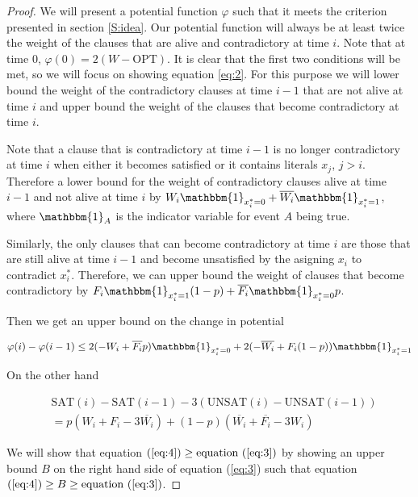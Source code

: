 \documentclass[11pt,letter]{article}
\numberwithin{theorem}{section}
\renewcommand{\phi}{\varphi}
\begin{document}
\begin{proof}
We will present a potential function $\phi$ such that it meets the criterion presented in section \ref{S:idea}. Our potential function will always
 be at least twice the weight of the clauses that are alive and contradictory at time $i$. Note that at time $0$,
 $\phi(0) = 2(W-\textrm{OPT})$. It is clear that the first two conditions will be met, so we will focus on showing equation \ref{eq:2}.
 For this purpose we will lower bound the weight of the contradictory clauses at time $i-1$ that are not alive at time $i$
 and upper bound the weight of the clauses that become contradictory at time $i$.

Note that a clause that is contradictory at time $i-1$ is no longer contradictory at time $i$ when either it becomes satisfied
or it contains literals $x_j$, $j > i$. Therefore a lower bound for the weight of contradictory clauses alive at time $i-1$ and
 not alive at time $i$ by $W_i \mathbbm{1}_{x_i^* = 0} + \overline{W_i} \mathbbm{1}_{x_i^* = 1}$, where $\mathbbm{1}_A$ is the indicator variable for event $A$ being true.

Similarly, the only clauses that can become contradictory at time $i$ are those that are still alive at time $i-1$ and become unsatisfied
 by the asigning $x_i$ to contradict $x_i^*$. Therefore, we can upper bound the weight of clauses that become contradictory by
 $F_i \mathbbm{1}_{x_i^* = 1} (1-p) + \overline{F_i} \mathbbm{1}_{x_i^* = 0}p$.

Then we get an upper bound on the change in potential

\begin{equation}
\label{eq:3}
\phi(i) - \phi(i-1) \leq 2(-W_i + \overline{F_i} p) \mathbbm{1}_{x_i^* = 0} + 2(-\overline{W_i} + F_i(1-p))\mathbbm{1}_{x_i^* = 1}
\end{equation}

On the other hand

\begin{equation}
\begin{aligned}
\label{eq:4}
& \textrm{SAT}(i) - \textrm{SAT}(i-1) - 3(\textrm{UNSAT}(i) - \textrm{UNSAT}(i-1)) \\
& = p(W_i + F_i - 3\overline{W_i}) + (1-p)(\overline{W_i} + \overline{F_i} - 3W_i)
\end{aligned}
\end{equation}

We will show that equation $(\ref{eq:4}) \geq \text{equation } (\ref{eq:3})$ by showing an upper bound $B$ on the right hand side of equation (\ref{eq:3}) such that equation $(\ref{eq:4}) \geq B \geq \text{equation } (\ref{eq:3})$.


\end{proof}
\end{document}
